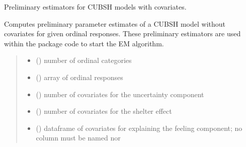 \documentclass[letterpaper,10pt,english]{sphinxmanual}
\begin{document}

\begin{fulllineitems}
\label{\detokenize{cubmods:cubmods.cubsh_ywx.init_theta}}
\pysigstartsignatures
{}
\pysigstopsignatures
\sphinxAtStartPar
Preliminary estimators for CUBSH models with covariates.

\sphinxAtStartPar
Computes preliminary parameter estimates of a CUBSH model without covariates for given ordinal
responses. These preliminary estimators are used within the package code to start the E\sphinxhyphen{}M algorithm.
\begin{quote}\begin{description}
\begin{itemize}
\item {} 
\sphinxAtStartPar
{} () \textendash{} number of ordinal categories

\item {} 
\sphinxAtStartPar
{} () \textendash{} array of ordinal responses

\item {} 
\sphinxAtStartPar
{} () \textendash{} number of covariates for the uncertainty component

\item {} 
\sphinxAtStartPar
{} () \textendash{} number of covariates for the shelter effect

\item {} 
\sphinxAtStartPar
{} () \textendash{} dataframe of covariates for explaining the feeling component;
no column must be named  nor 

\end{itemize}


\end{description}
\end{quote}
\end{fulllineitems}
\end{document}
